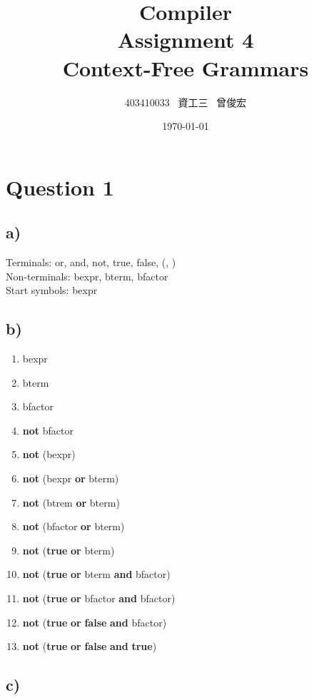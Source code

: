 \documentclass[12pt, A4]{article}
\title{Compiler \\ Assignment 4 \\ Context-Free Grammars}
\author{403410033 \ 資工三 \ 曾俊宏}
\date{\today}
\begin{document}
	
	\maketitle
	\newpage

	\section{Question 1}
	
	\subsection*{a)}
	
	Terminals: or, and, not, true, false, (, )\\
	Non-terminals: bexpr, bterm, bfactor\\
	Start symbols: bexpr\\
	
	\subsection*{b)}
	
	\begin{enumerate}
		\item bexpr
		\item bterm
		\item bfactor
		\item \textbf{not} bfactor
		\item \textbf{not} (bexpr)
		\item \textbf{not} (bexpr \textbf{or} bterm)
		\item \textbf{not} (btrem \textbf{or} bterm)
		\item \textbf{not} (bfactor \textbf{or} bterm)
		\item \textbf{not} (\textbf{true} \textbf{or} bterm)
		\item \textbf{not} (\textbf{true} \textbf{or} bterm \textbf{and} bfactor)
		\item \textbf{not} (\textbf{true} \textbf{or} bfactor \textbf{and} bfactor)
		\item \textbf{not} (\textbf{true} \textbf{or} \textbf{false} \textbf{and} bfactor)
		\item \textbf{not} (\textbf{true} \textbf{or} \textbf{false} \textbf{and} \textbf{true})
		
	\end{enumerate}
	
	\subsection*{c)}
	
\end{document}
